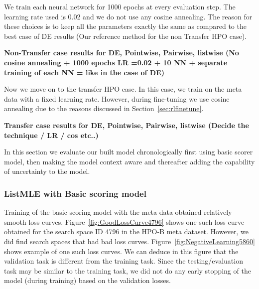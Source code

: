 \documentclass[12pt, twoside, ngerman]{report}
\begin{document}
We train each neural network for 1000 epochs at every evaluation step.
The learning rate used is 0.02 and we do not use any cosine annealing.
The reason for these choices is to keep all the parameters exactly the same as compared to the best case of DE results (Our reference method for the non Transfer HPO case).

\textbf{Non-Transfer case results for DE,  Pointwise,  Pairwise,  listwise (No cosine annealing + 1000 epochs LR =0.02 + 10 NN + separate training of each NN = like in the case of DE)}

Now we move on to the transfer HPO case.
In this case,  we train on the meta data with a fixed learning rate.
However,  during fine-tuning we use cosine annealing due to the reasons discussed in Section~\ref{sec:rlfinetune}.

\textbf{Transfer case results for DE,  Pointwise,  Pairwise,  listwise (Decide the technique / LR / cos etc..)}

In this section we evaluate our built model chronologically first using basic scorer model,  then making the model context aware and thereafter adding the capability of uncertainty to the model.

\subsubsection{ListMLE with Basic scoring model}
Training of the basic scoring model with the meta data obtained relatively smooth loss curves.
Figure~\ref{fig:GoodLossCurve4796} shows one such loss curve obtained for the search space ID 4796 in the HPO-B meta dataset.
However,  we did find search spaces that had bad loss curves.
Figure~\ref{fig:NegativeLearning5860} shows example of one such loss curves.
We can deduce in this figure that the validation task is different from the training task.
Since the testing/evaluation task may be similar to the training task,  we did not do any early stopping of the model (during training) based on the validation losses.
\end{document}
